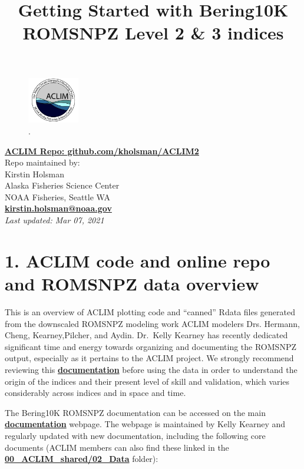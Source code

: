 \documentclass[
]{article}
\title{Getting Started with Bering10K ROMSNPZ Level 2 \& 3 indices}
\author{}
\date{\vspace{-2.5em}}
\begin{document}
\maketitle

{
\setcounter{tocdepth}{2}
\tableofcontents
}
\begin{figure}
\centering
\includegraphics[width=0.2\textwidth,height=\textheight]{Figs/ACLIM_logo.jpg}
\caption{.}
\end{figure}

\href{https://github.com/kholsman/ACLIM2}{\textbf{ACLIM Repo:
github.com/kholsman/ACLIM2}}\\
Repo maintained by:\\
Kirstin Holsman\\
Alaska Fisheries Science Center\\
NOAA Fisheries, Seattle WA\\
\textbf{\url{kirstin.holsman@noaa.gov}}~\\
\emph{Last updated: Mar 07, 2021}

\hypertarget{aclim-code-and-online-repo-and-romsnpz-data-overview}{%
\section{1. ACLIM code and online repo and ROMSNPZ data
overview}\label{aclim-code-and-online-repo-and-romsnpz-data-overview}}

This is an overview of ACLIM plotting code and ``canned'' Rdata files
generated from the downscaled ROMSNPZ modeling work ACLIM modelers Drs.
Hermann, Cheng, Kearney,Pilcher, and Aydin. Dr.~Kelly Kearney has
recently dedicated significant time and energy towards organizing and
documenting the ROMSNPZ output, especially as it pertains to the ACLIM
project. We strongly recommend reviewing this
\href{https://beringnpz.github.io/roms-bering-sea/B10K-dataset-docs/}{\textbf{documentation}}
before using the data in order to understand the origin of the indices
and their present level of skill and validation, which varies
considerably across indices and in space and time.

The Bering10K ROMSNPZ documentation can be accessed on the main
\href{https://beringnpz.github.io/roms-bering-sea/B10K-dataset-docs/}{\textbf{documentation}}
webpage. The webpage is maintained by Kelly Kearney and regularly
updated with new documentation, including the following core documents
(ACLIM members can also find these linked in the
\href{https://drive.google.com/drive/u/0/folders/0Bx7wdZllbuF9eDJndkhCS2EwQUk}{\textbf{00\_ACLIM\_shared/02\_Data}}
folder):
\end{document}

